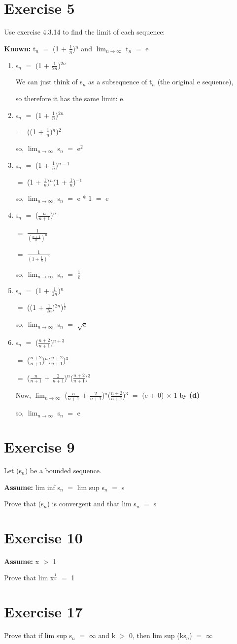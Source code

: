 \documentclass{article}
\newcommand{\mt}[1]{\ensuremath{#1}}
\newcommand\bsc[2][\DefaultOpt]{%
  \def\DefaultOpt{#2}%
  \section[#1]{#2}%
}
\newcommand{\balist}{\begin{enumerate}[label=\alph*.]}
\newcommand{\elist}{\end{enumerate}}
\newcommand{\as}[1]{\textbf{Assume: } #1}
\newcommand{\bpth}[1]{\textbf{(#1)}}
\newcommand{\prn}[1]{(#1)}
\newcommand{\ps}{\mt{+} }
\newcommand{\gr}{\mt{>} }
\newcommand{\eql}{\mt{=} }
\newcommand{\uw}[2]{#1\mt{_{#2}}}
\newcommand{\uf}[2]{#1\mt{^{#2}}}
\newcommand{\frc}[2]{\mt{\frac{#1}{#2}}}
\newcommand{\lmti}[1]{\mt{\displaystyle{\lim_{#1 \to \infty}}}}
\newcommand{\infy}{\mt{\infty} }
\begin{document}
\bsc{Exercise 5}{

Use exercise 4.3.14 to find the limit of each sequence:

\textbf{Known:} \uw{t}{n} \eql \prn{1 \ps \frc{1}{n}}$^n$  and \lmti{n} \uw{t}{n} \eql e

\balist
\item \uw{s}{n} \eql (1 + \frc{1}{2n})$^{2n}$
	
	We can just think of \uw{s}{n} as a subsequence of \uw{t}{n} (the original e sequence),
	
	so therefore it has the same limit: e.
\item \uw{s}{n} \eql (1 + \frc{1}{n})$^{2n}$
	
	\eql ((1 + \frc{1}{n})$^n$)$^2$
	
	so, \lmti{n} \uw{s}{n} \eql e$^2$
\item \uw{s}{n} \eql (1 + \frc{1}{n})$^{n - 1}$

	\eql (1 + \frc{1}{n})$^{n}$(1 + \frc{1}{n})$^{-1}$
	
	so, \lmti{n} \uw{s}{n} \eql e * 1 \eql e
\item \uw{s}{n} \eql (\frc{n	}{n + 1})$^{n}$
	
	\eql \frc{1}{(\frc{n + 1}{n})^n}
	
	\eql \frc{1}{(1 + \frc{1}{n})^n}
	
	so, \lmti{n} \uw{s}{n} \eql \frc{1}{e}
\item \uw{s}{n} \eql (1 + \frc{1	}{2n})$^{n}$
	
	\eql ((1 + \frc{1}{2n})$^{2n}$)$^\frac{1}{2}$
	
	so, \lmti{n} \uw{s}{n} \eql $\sqrt{e}$
	
\item \uw{s}{n} \eql (\frc{n + 2	}{n + 1})$^{n + 3}$
	
	\eql (\frc{n + 2}{n + 1})$^{n}$(\frc{n + 2	}{n + 1})$^{3}$
	
	\eql (\frc{n}{n + 1} \ps \frc{2}{n + 1})$^{n}$(\frc{n + 2	}{n + 1})$^{3}$
	
	Now, \lmti{n} (\frc{n}{n + 1} \ps \frc{2}{n + 1})$^{n}$(\frc{n + 2	}{n + 1})$^{3}$ \eql (e + 0) $\times$ 1 by \bpth{d}
	
	so, \lmti{n} \uw{s}{n} \eql e
\elist

}

\bsc{Exercise 9}{

Let \prn{\uw{s}{n}} be a bounded sequence.

\as{lim inf \uw{s}{n} \eql lim sup \uw{s}{n} \eql s}

Prove that \prn{\uw{s}{n}} is convergent and that lim \uw{s}{n} \eql s

}

\bsc{Exercise 10}{

\as{x \gr 1}

Prove that lim \uf{x}{\frc{1}{n}} \eql 1

}

\bsc{Exercise 17}{

Prove that if lim sup \uw{s}{n} \eql \infy and k \gr 0, then lim sup (k\uw{s}{n}) \eql \infy 

}
\end{document}
